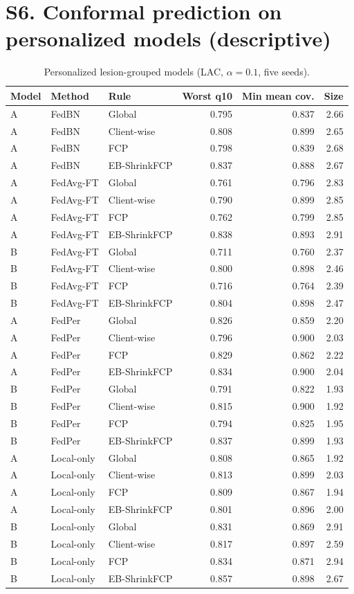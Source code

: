 \documentclass[10pt]{article}
\begin{document}
\section*{S6. Conformal prediction on personalized models (descriptive)}
\begin{table}[!htbp]
\centering
\scriptsize
\caption{Personalized lesion-grouped models (LAC, $\alpha=0.1$, five seeds).}
\label{tab:s7}
\begin{tabular}{@{}lllrrr@{}}
\toprule
Model & Method & Rule & Worst q10 & Min mean cov. & Size \\
\midrule
A & FedBN & Global & 0.795 & 0.837 & 2.66 \\
A & FedBN & Client-wise & 0.808 & 0.899 & 2.65 \\
A & FedBN & FCP & 0.798 & 0.839 & 2.68 \\
A & FedBN & EB-ShrinkFCP & 0.837 & 0.888 & 2.67 \\
A & FedAvg-FT & Global & 0.761 & 0.796 & 2.83 \\
A & FedAvg-FT & Client-wise & 0.790 & 0.899 & 2.85 \\
A & FedAvg-FT & FCP & 0.762 & 0.799 & 2.85 \\
A & FedAvg-FT & EB-ShrinkFCP & 0.838 & 0.893 & 2.91 \\
B & FedAvg-FT & Global & 0.711 & 0.760 & 2.37 \\
B & FedAvg-FT & Client-wise & 0.800 & 0.898 & 2.46 \\
B & FedAvg-FT & FCP & 0.716 & 0.764 & 2.39 \\
B & FedAvg-FT & EB-ShrinkFCP & 0.804 & 0.898 & 2.47 \\
A & FedPer & Global & 0.826 & 0.859 & 2.20 \\
A & FedPer & Client-wise & 0.796 & 0.900 & 2.03 \\
A & FedPer & FCP & 0.829 & 0.862 & 2.22 \\
A & FedPer & EB-ShrinkFCP & 0.834 & 0.900 & 2.04 \\
B & FedPer & Global & 0.791 & 0.822 & 1.93 \\
B & FedPer & Client-wise & 0.815 & 0.900 & 1.92 \\
B & FedPer & FCP & 0.794 & 0.825 & 1.95 \\
B & FedPer & EB-ShrinkFCP & 0.837 & 0.899 & 1.93 \\
A & Local-only & Global & 0.808 & 0.865 & 1.92 \\
A & Local-only & Client-wise & 0.813 & 0.899 & 2.03 \\
A & Local-only & FCP & 0.809 & 0.867 & 1.94 \\
A & Local-only & EB-ShrinkFCP & 0.801 & 0.896 & 2.00 \\
B & Local-only & Global & 0.831 & 0.869 & 2.91 \\
B & Local-only & Client-wise & 0.817 & 0.897 & 2.59 \\
B & Local-only & FCP & 0.834 & 0.871 & 2.94 \\
B & Local-only & EB-ShrinkFCP & 0.857 & 0.898 & 2.67 \\
\bottomrule
\end{tabular}
\end{table}
\end{document}
